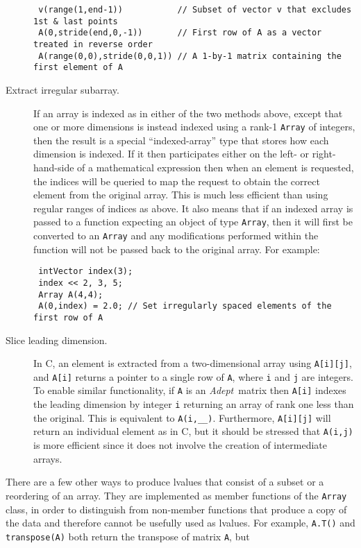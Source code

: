 \documentclass[a4,oneside]{book}
\def\codesize{\small}
\def\Adept{\emph{Adept}}
\def\code#1{{\codesize\texttt{#1}}}
\begin{document}
\begin{description}
\begin{lstlisting}
 v(range(1,end-1))           // Subset of vector v that excludes 1st & last points
 A(0,stride(end,0,-1))       // First row of A as a vector treated in reverse order
 A(range(0,0),stride(0,0,1)) // A 1-by-1 matrix containing the first element of A
\end{lstlisting}
\item[Extract irregular subarray.] If an array is indexed as in either
  of the two methods above, except that one or more dimensions is
  instead indexed using a rank-1 \code{Array} of integers, then the
  result is a special ``indexed-array'' type that stores how each
  dimension is indexed.  If it then participates either on the left-
  or right-hand-side of a mathematical expression then when an element
  is requested, the indices will be queried to map the request to
  obtain the correct element from the original array. This is much
  less efficient than using regular ranges of indices as above. It
  also means that if an indexed array is passed to a function
  expecting an object of type \code{Array}, then it will first be
  converted to an \code{Array} and any modifications performed within
  the function will not be passed back to the original array. For
  example:
\begin{lstlisting}
 intVector index(3);
 index << 2, 3, 5;
 Array A(4,4);
 A(0,index) = 2.0; // Set irregularly spaced elements of the first row of A
\end{lstlisting}
\item[Slice leading dimension.] In C, an element is extracted from a
  two-dimensional array using \code{A[i][j]}, and \code{A[i]} returns
  a pointer to a single row of \code{A}, where \code{i} and \code{j}
  are integers. To enable similar functionality, if \code{A} is an
  \Adept\ matrix then \code{A[i]} indexes the leading dimension by
  integer \code{i} returning an array of rank one less than the
  original. This is equivalent to \code{A(i,\_\_)}. Furthermore,
  \code{A[i][j]} will return an individual element as in C, but it
  should be stressed that \code{A(i,j)} is more efficient since it
  does not involve the creation of intermediate arrays.
\end{description}
%
There are a few other ways to produce lvalues that consist of a subset
or a reordering of an array. They are implemented as member functions
of the \code{Array} class, in order to distinguish from non-member
functions that produce a copy of the data and therefore cannot be
usefully used as lvalues.  For example, \code{A.T()} and
\code{transpose(A)} both return the transpose of matrix \code{A}, but
\end{document}
